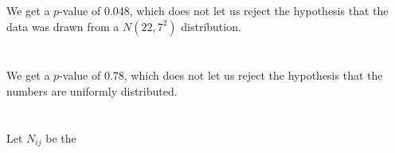 \documentclass[twocolumn]{article}
\newcommand{\setsection}[1]{\setcounter{section}{#1}\addtocounter{section}{-1}\section{}}
\newcommand{\nsub}[2]{N_{#1 #2}}
\newcommand{\na}{\nsub{i}{j}}
\begin{document}
\subsection{}

We get a $p$-value of 0.048, which does not let us reject the hypothesis that the data was drawn from a $N(22,7^2)$ distribution.

\setsection{25}

We get a $p$-value of 0.78, which does not let us reject the hypothesis that the numbers are uniformly distributed.

\setsection{29}

Let $\na{}$ be the 
\end{document}
